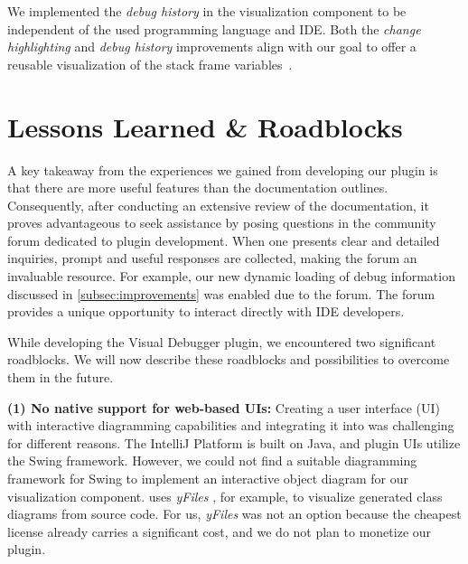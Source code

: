 \documentclass[sigconf]{acmart}
\begin{document}
We implemented the \textit{debug history} in the visualization component to be independent of the used programming language and IDE.
Both the \textit{change highlighting} and \textit{debug history} improvements align with our goal to offer a reusable visualization of the stack frame variables~\cite{krauterVisualDebuggerTool2022}.

\section{Lessons Learned \& Roadblocks} \label{sec:lessonsLearned}


A key takeaway from the experiences we gained from developing our plugin is that there are more useful features than the documentation outlines. 
Consequently, after conducting an extensive review of the documentation, it proves advantageous to seek assistance by posing questions in the community forum dedicated to plugin development. 
When one presents clear and detailed inquiries, prompt and useful responses are collected, making the forum an invaluable resource.
For example, our new dynamic loading of debug information discussed in \autoref{subsec:improvements} was enabled due to the \intellij{} forum.
The forum provides a unique opportunity to interact directly with IDE developers.

While developing the Visual Debugger plugin, we encountered two significant roadblocks.
We will now describe these roadblocks and possibilities to overcome them in the future.

\textbf{(1) No native support for web-based UIs:} Creating a user interface (UI) with interactive diagramming capabilities and integrating it into \intellij{} was challenging for different reasons.
The IntelliJ Platform is built on Java, and plugin UIs utilize the Swing framework.
However, we could not find a suitable diagramming framework for Swing to implement an interactive object diagram for our visualization component.
\intellij{} uses \textit{yFiles} \cite{yworksYFilesDiagrammingLibrary2023}, for example, to visualize generated class diagrams from source code.
For us, \textit{yFiles} was not an option because the cheapest license already carries a significant cost, and we do not plan to monetize our plugin.
\end{document}
